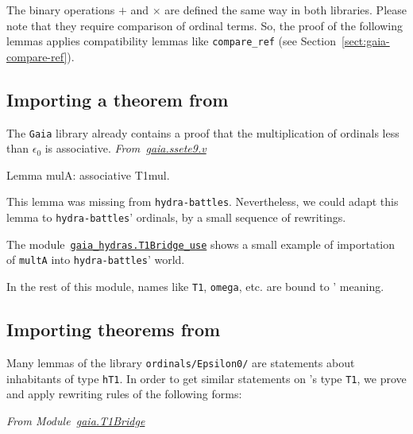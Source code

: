 The binary operations $+$ and $\times$ are defined the same way in both libraries. Please note that they require comparison of ordinal terms. So, the proof of the following lemmas applies
compatibility lemmas like \texttt{compare\_ref} (see Section~\vref{sect:gaia-compare-ref}).



\subsection{Importing a theorem from \gaia}
The \texttt{Gaia} library already contains a proof that the multiplication of ordinals less than $\epsilon_0$ is associative.
\emph{From~\href{https://github.com/coq-community/gaia/blob/master/theories/ssete9.v}{gaia.ssete9.v}}

\begin{Coqsrc}
Lemma mulA: associative T1mul.
\end{Coqsrc}

This lemma was missing from \texttt{hydra-battles}. Nevertheless, we could adapt this lemma to \texttt{hydra-battles}' ordinals, by a small sequence of rewritings.


The module~\href{../theories/html/gaia_hydras.T1Bridge_use.html}%
{\texttt{gaia\_hydras.T1Bridge\_use}} shows a small
example of importation of \texttt{multA} into \texttt{hydra-battles}' world.


In the rest of this module, names like  \texttt{T1}, \texttt{omega}, etc. are  bound to \HydrasLib' meaning.


\subsection{Importing theorems from \HydrasLib}


Many lemmas of the library \texttt{ordinals/Epsilon0/} are statements about inhabitants of type \texttt{hT1}. In order to get
similar statements on \gaia's type \texttt{T1}, we prove and
apply rewriting rules of the following forms:

\vspace{4pt}

\noindent\emph{From Module~\href{../theories/html/gaia.T1Bridge.html}{gaia.T1Bridge}}

